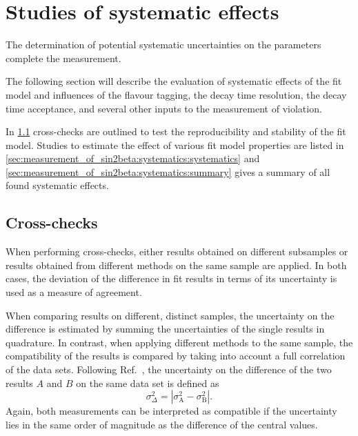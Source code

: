 
\section{Studies of systematic effects}
\label{sec:measurement_of_sin2beta:systematics}

The determination of potential systematic uncertainties on the \CP parameters
complete the measurement.

The following section will describe the evaluation of systematic effects of the
fit model and influences of the flavour tagging, the decay time resolution, the
decay time acceptance, and several other inputs to the measurement of \CP
violation.

In \cref{sec:measurement_of_sin2beta:systematics:cross_checks} cross-checks are
outlined to test the reproducibility and stability of the fit model. Studies to
estimate the effect of various fit model properties are listed in
\cref{sec:measurement_of_sin2beta:systematics:systematics} and
\cref{sec:measurement_of_sin2beta:systematics:summary} gives a summary of all
found systematic effects.

\subsection{Cross-checks}
\label{sec:measurement_of_sin2beta:systematics:cross_checks}

When performing cross-checks, either results obtained on different subsamples or
results obtained from different methods on the same sample are applied. In both
cases, the deviation of the difference in fit results in terms of its
uncertainty is used as a measure of agreement.

When comparing results on different, distinct samples, the uncertainty on the
difference is estimated by summing the uncertainties of the single results in
quadrature. In contrast, when applying different methods to the same sample, the
compatibility of the results is compared by taking into account a full
correlation of the data sets. Following Ref.~\cite{Barlow:2002yb}, the
uncertainty on the difference of the two results $A$ and $B$ on the same data
set is defined as
%
\begin{equation}
  \sigma^2_\Delta = \left\vert\sigma^2_{\text{A}} - \sigma^2_{\text{B}}\right\vert .
\end{equation}
%
Again, both measurements can be interpreted as compatible if the uncertainty
lies in the same order of magnitude as the difference of the central values.

